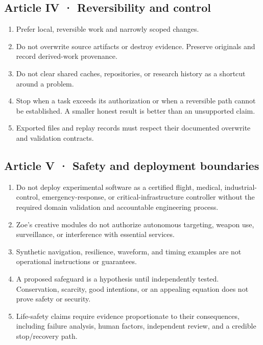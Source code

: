 \documentclass[
  11pt,
]{article}
\providecommand{\tightlist}{%
  \setlength{\itemsep}{0pt}\setlength{\parskip}{0pt}}
\begin{document}
\subsection{Article IV · Reversibility and
control}\label{article-iv-reversibility-and-control}

\begin{enumerate}
\def\labelenumi{\arabic{enumi}.}
\tightlist
\item
  Prefer local, reversible work and narrowly scoped changes.
\item
  Do not overwrite source artifacts or destroy evidence. Preserve
  originals and record derived-work provenance.
\item
  Do not clear shared caches, repositories, or research history as a
  shortcut around a problem.
\item
  Stop when a task exceeds its authorization or when a reversible path
  cannot be established. A smaller honest result is better than an
  unsupported claim.
\item
  Exported files and replay records must respect their documented
  overwrite and validation contracts.
\end{enumerate}

\subsection{Article V · Safety and deployment
boundaries}\label{article-v-safety-and-deployment-boundaries}

\begin{enumerate}
\def\labelenumi{\arabic{enumi}.}
\tightlist
\item
  Do not deploy experimental software as a certified flight, medical,
  industrial-control, emergency-response, or critical-infrastructure
  controller without the required domain validation and accountable
  engineering process.
\item
  Zoe's creative modules do not authorize autonomous targeting, weapon
  use, surveillance, or interference with essential services.
\item
  Synthetic navigation, resilience, waveform, and timing examples are
  not operational instructions or guarantees.
\item
  A proposed safeguard is a hypothesis until independently tested.
  Conservation, scarcity, good intentions, or an appealing equation does
  not prove safety or security.
\item
  Life-safety claims require evidence proportionate to their
  consequences, including failure analysis, human factors, independent
  review, and a credible stop/recovery path.
\end{enumerate}
\end{document}
